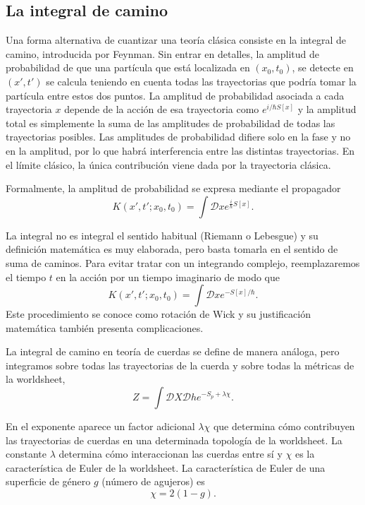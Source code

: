 
\subsection{La integral de camino}

Una forma alternativa de cuantizar una teoría clásica consiste en la integral de camino, 
introducida por Feynman. 
Sin entrar en detalles, la amplitud de probabilidad de que una partícula que está localizada 
en $(x_0,t_0)$, se detecte en $(x',t')$ se calcula teniendo en cuenta todas las trayectorias
que podría tomar la partícula entre estos dos puntos.
La amplitud de probabilidad asociada a cada trayectoria $x$ depende de la acción de esa trayectoria
como $e^{i/\hbar S[x]}$ y la amplitud total es simplemente la suma de las amplitudes de probabilidad
de todas las trayectorias posibles.
Las amplitudes de probabilidad difiere solo en la fase y no en la amplitud, por lo que habrá 
interferencia entre las distintas trayectorias.
En el límite clásico, la única contribución viene dada por la trayectoria clásica.

Formalmente, la amplitud de probabilidad se expresa mediante el propagador
\begin{equation}
  K(x',t';x_0,t_0) = \int \mathcal Dx e^{\frac{i}{\hbar} S[x]}.
\end{equation}

La integral no es integral el sentido habitual (Riemann o Lebesgue) y su definición matemática
es muy elaborada, pero basta tomarla en el sentido de suma de caminos.
Para evitar tratar con un integrando complejo, reemplazaremos el tiempo $t$ en la acción por un tiempo imaginario de modo que
\begin{equation}
  K(x',t';x_0,t_0) = \int \mathcal Dx e^{- S[x]/ \hbar}.
\end{equation}
Este procedimiento se conoce como rotación de Wick y su justificación matemática también presenta complicaciones.


La integral de camino en teoría de cuerdas se define de manera análoga, pero integramos 
sobre todas las trayectorias de la cuerda y sobre todas la métricas de la worldsheet,
\begin{equation}
  Z = \int \mathcal DX \mathcal Dh e^{-S_p+\lambda \chi}.
\end{equation}

En el exponente aparece un factor adicional $\lambda\chi$ que determina cómo contribuyen las trayectorias
de cuerdas en una determinada topología de la worldsheet.
La constante $\lambda$ determina cómo interaccionan las cuerdas entre sí y $\chi$ es la característica
de Euler de la worldsheet.
La característica de Euler de una superficie de género $g$ (número de agujeros) es
\begin{equation}
  \chi = 2(1-g).
\end{equation}

